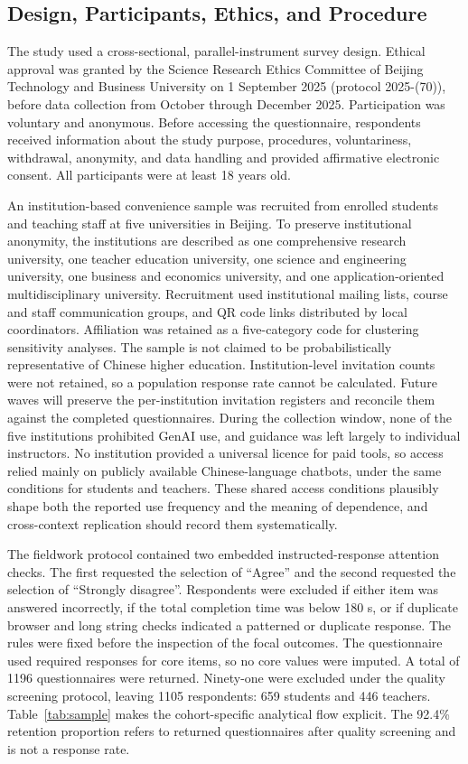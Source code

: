\documentclass[sustainability,article,accept,moreauthors]{Definitions/mdpi}
\begin{document}
\subsection{Design, Participants, Ethics, and Procedure}\label{sec:design}

The study used a cross-sectional, parallel-instrument survey design. Ethical approval was granted by the Science Research Ethics Committee of Beijing Technology and Business University on 1 September 2025 (protocol 2025-(70)), before data collection from October through December 2025. Participation was voluntary and anonymous. Before accessing the questionnaire, respondents received information about the study purpose, procedures, voluntariness, withdrawal, anonymity, and data handling and provided affirmative electronic consent. All participants were at least 18 years old.

An institution-based convenience sample was recruited from enrolled students and teaching staff at five universities in Beijing. To preserve institutional anonymity, the institutions are described as one comprehensive research university, one teacher education university, one science and engineering university, one business and economics university, and one application-oriented multidisciplinary university. Recruitment used institutional mailing lists, course and staff communication groups, and QR code links distributed by local coordinators. Affiliation was retained as a five-category code for clustering sensitivity analyses. The sample is not claimed to be probabilistically representative of Chinese higher education. Institution-level invitation counts were not retained, so a population response rate cannot be calculated. Future waves will preserve the per-institution invitation registers and reconcile them against the completed questionnaires. During the collection window, none of the five institutions prohibited GenAI use, and guidance was left largely to individual instructors. No institution provided a universal licence for paid tools, so access relied mainly on publicly available Chinese-language chatbots, under the same conditions for students and teachers. These shared access conditions plausibly shape both the reported use frequency and the meaning of dependence, and cross-context replication should record them systematically.

The fieldwork protocol contained two embedded instructed-response attention checks. The first requested the selection of ``Agree'' and the second requested the selection of ``Strongly disagree''. Respondents were excluded if either item was answered incorrectly, if the total completion time was below 180 s, or if duplicate browser and long string checks indicated a patterned or duplicate response. The rules were fixed before the inspection of the focal outcomes. The questionnaire used required responses for core items, so no core values were imputed.
A total of 1196 questionnaires were returned. Ninety-one were excluded under the quality screening protocol, leaving 1105 respondents: 659 students and 446 teachers. Table~\ref{tab:sample} makes the cohort-specific analytical flow explicit. The 92.4\% retention proportion refers to returned questionnaires after quality screening and is not a response rate.
\end{document}
